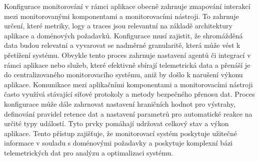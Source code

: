 Konfigurace monitorování v rámci aplikace obecně zahrnuje zmapování interakcí mezi monitorovanými komponentami a monitorovacími nástroji. To zahrnuje určení, které metriky, logy a traces jsou relevantní na základě architektury aplikace a doménových požadavků. Konfigurace musí zajistit, že shromážděná data budou relevatní a vyvarovat se nadměrné granularitě, která může vést k přetížení systému. \cite{Blanco2023} Obvykle tento proces zahrnuje nastavení agentů či integrací v rámci aplikace nebo služeb, které efektivně sbírají telemetrická data a přenáší je do centralizovaného monitorovacího systému, aniž by došlo k narušení výkonu aplikace. Komunikace mezi aplikačními komponentami a monitorovacími nástroji často využívá stávající síťové protokoly a metody bezpečného přenosu dat. Proces konfigurace může dále zahrnovat nastavení hraničních hodnot pro výstrahy, definování pravidel retence dat a nastavení parametrů pro automatické reakce na určité typy událostí. Tyto prvky pomáhají udržovat celkový stav a výkon aplikace. \cite{Blanco2023} Tento přístup zajišťuje, že monitorovací systém poskytuje užitečné informace v souladu s doménovými požadavky a poskytuje komplexní bázi telemetrických dat pro analýzu a optimalizaci systému. 